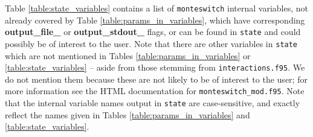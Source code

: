 \documentclass{report}
\begin{document}
Table \ref{table:state_variables} contains a list of \texttt{monteswitch} internal variables, not already covered by Table \ref{table:params_in_variables},
which have corresponding \textbf{output\_file\_} or \textbf{output\_stdout\_} flags, or can be found in \texttt{state} and could possibly be of interest
to the user. Note that there are other variables in \texttt{state} which are not mentioned in Tables \ref{table:params_in_variables} or 
\ref{table:state_variables} -- aside from those stemming from \texttt{interactions.f95}. We do not mention them because these are not likely to be of
interest to the user; for more information see the HTML documentation for \texttt{monteswitch\_mod.f95}.
Note that the internal variable names output in \texttt{state} are case-sensitive, and exactly reflect the names given in Tables 
\ref{table:params_in_variables} and \ref{table:state_variables}.
\end{document}
